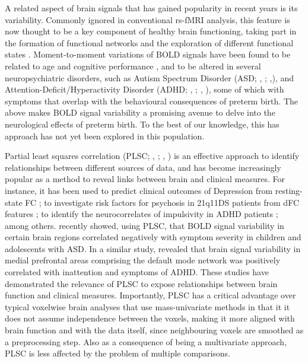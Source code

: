    A related aspect of brain signals that has gained popularity in recent years is its variability. Commonly ignored in conventional rs-fMRI analysis, this feature is now thought to be a key component of healthy brain functioning, taking part in the formation of functional networks \citep{Fuchs2007} and the exploration of different functional states \citep{Ghosh2008, McIntosh2010}. Moment-to-moment variations of BOLD signals have been found to be related to age and cognitive performance \citep{Garrett2013}, and to be altered in several neuropsychiatric disorders, such as Autism Spectrum Disorder (ASD; \citeauthor{DiMartino2014}, \citeyear{DiMartino2014}; \citeauthor{Easson2019},\citeyear{Easson2019}), and  Attention-Deficit/Hyperactivity Disorder (ADHD; \citeauthor{Zang2007}, \citeyear{Zang2007}; \citeauthor{Nomi2018}, \citeyear{Nomi2018}), some of which with symptoms that overlap with the behavioural consequences of preterm birth. The above makes BOLD signal variability a promising avenue to delve into the neurological effects of preterm birth. To the best of our knowledge, this has approach has not yet been explored in this population.

      Partial least squares correlation (PLSC; \citeauthor{McIntosh2004}, \citeyear{McIntosh2004}; \citeauthor{Krishnan2011}, \citeyear{Krishnan2011})  is an effective approach to identify relationships between different sources of data, and has become increasingly popular as a method to reveal links between brain and clinical measures. For instance, it has been used to predict clinical outcomes of Depression from resting-state FC \citep{Yoshida2017}; to investigate risk factors for psychosis in 21q11DS patients from dFC features \citep{Zoller2019}; to identify the neurocorrelates of impulsivity in ADHD patients \citep{Barker2019}; among others. \cite{Easson2019} recently showed, using PLSC, that BOLD signal variability in certain brain regions correlated negatively with symptom severity in children and adolescents with ASD. In a similar study, \citep{Nomi2018} revealed that brain signal variability in medial prefrontal areas comprising the default mode network was positively correlated with inattention and symptoms of ADHD. These studies have demonstrated the relevance of PLSC to expose relationships between brain function and clinical measures. Importantly, PLSC has a critical advantage over typical voxelwise brain analyses that use mass-univariate methods in that it it does not assume independence between the voxels, making it more aligned with brain function and with the data itself, since neighbouring voxels are smoothed as a preprocessing step. Also as a consequence of being a multivariate approach, PLSC is less affected by the problem of multiple comparisons. 
      
